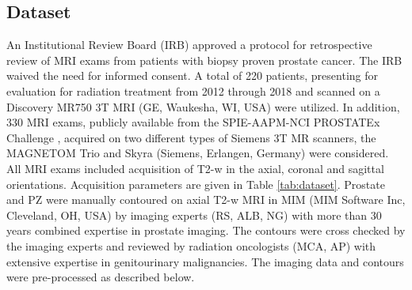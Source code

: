 \subsection{Dataset}
\label{subsec:dataset}
 An Institutional Review Board (IRB) approved a protocol for retrospective review of MRI exams from patients with biopsy proven prostate cancer. The IRB waived the need for informed consent. A total of 220 patients, presenting for evaluation for radiation treatment from 2012 through 2018 and scanned on a Discovery MR750 3T MRI (GE, Waukesha, WI, USA) were utilized. In addition, 330 MRI exams, publicly available from the SPIE-AAPM-NCI PROSTATEx Challenge \cite{litjens2014evaluation}, acquired on two different types of Siemens 3T MR scanners, the MAGNETOM Trio and Skyra (Siemens, Erlangen, Germany) were considered. All MRI exams included acquisition of T2-w in the axial, coronal and sagittal orientations. Acquisition parameters are given in Table \ref{tab:dataset}.
Prostate and PZ were manually contoured on axial T2-w MRI in MIM (MIM Software Inc, Cleveland, OH, USA) by imaging experts (RS, ALB, NG) with more than 30 years combined expertise in prostate imaging. The contours were cross checked by the imaging experts and reviewed by radiation oncologists (MCA, AP) with extensive expertise in genitourinary malignancies.
The imaging data and contours were pre-processed as described below.

